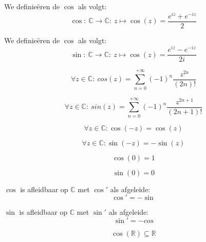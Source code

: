 \documentclass[main.tex]{subfiles}
\begin{document}
\begin{de}
  We definie\"eren de  $\cos$ als volgt:
  \[ \cos:\ \mathbb{C} \rightarrow \mathbb{C}:\ z \mapsto \cos(z) = \frac{e^{iz} + e^{-iz}}{2} \]
\end{de}

\begin{de}
  We definie\"eren de  $\cos$ als volgt:
  \[ \sin:\ \mathbb{C} \rightarrow \mathbb{C}:\ z \mapsto \cos(z) = \frac{e^{iz} - e^{-iz}}{2i} \]
\end{de}

\begin{bpr}
  \[ \forall z \in \mathbb{C}:\ cos(z) = \sum_{n=0}^{+\infty}(-1)^{n}\frac{z^{2n}}{(2n)!} \]
\end{bpr}

\begin{bpr}
  \[ \forall z \in \mathbb{C}:\ sin(z) = \sum_{n=0}^{+\infty}(-1)^{n}\frac{z^{2n+1}}{(2n+1)!} \]
\end{bpr}

\begin{bpr}
  \[ \forall z \in \mathbb{C}: \cos(-z) = \cos(z) \]
\end{bpr}

\begin{bpr}
  \[ \forall z \in \mathbb{C}: \sin(-z) = -\sin(z) \]
\end{bpr}

\begin{bpr}
  \[ \cos(0) = 1 \]
\end{bpr}

\begin{bpr}
  \[ \sin(0) = 0 \]
\end{bpr}

\begin{bpr}
  $\cos$ is afleidbaar op $\mathbb{C}$ met $\cos'$ als afgeleide:
  \[ \cos' = -\sin \]
\end{bpr}

\begin{bpr}
  $\sin$ is afleidbaar op $\mathbb{C}$ met $\sin'$ als afgeleide:
  \[ \sin' = -cos \]
\end{bpr}

\begin{bpr}
  \[ \cos(\mathbb{R}) \subseteq \mathbb{R} \]
\end{bpr}
\end{document}
